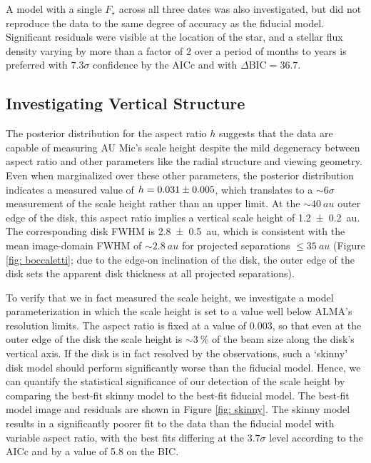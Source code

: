 \documentclass[modern]{aastex62}
\begin{document}
A model with a single $F_\star$ across all three dates was also investigated, but did not reproduce the data to the same degree of accuracy as the fiducial model.
Significant residuals were visible at the location of the star, and  a stellar flux density varying by more than a factor of 2 over a period of months to years is preferred with $7.3 \sigma$ confidence by the AICc and with $\Delta \text{BIC} = 36.7$.

\subsection{Investigating Vertical Structure}
\label{subsection: vertical analysis}

The posterior distribution for the aspect ratio $h$ suggests that the data are capable of measuring AU Mic's scale height despite the mild degeneracy between aspect ratio and other parameters like the radial structure and viewing geometry.  
Even when marginalized over these other parameters, the posterior distribution indicates a measured value of $h=\num{0.031 \pm 0.005}$, which translates to a $\sim 6 \sigma$ measurement of the scale height rather than an upper limit.
At the $\sim \SI{40}{au}$ outer edge of the disk, this aspect ratio implies a vertical scale height of \SI{1.2 \pm 0.2}{au}. 
The corresponding disk FWHM is \SI{2.8 \pm 0.5}{au}, which is consistent with the mean image-domain FWHM of $\sim \SI{2.8}{au}$ for projected separations $\leq \SI{35}{au}$ (Figure \ref{fig: boccaletti}; due to the edge-on inclination of the disk, the outer edge of the disk sets the apparent disk thickness at all projected separations).

To verify that we in fact measured the scale height, we investigate a model parameterization in which the scale height is set to a value well below ALMA's resolution limits.
The aspect ratio is fixed at a value of $0.003$, so that even at the outer edge of the disk the scale height is $\sim \SI{3}{\percent}$ of the beam size along the disk's vertical axis.
If the disk is in fact resolved by the observations, such a `skinny' disk model should perform significantly worse than the fiducial model.
Hence, we can quantify the statistical significance of our detection of the scale height by comparing the best-fit skinny model to the best-fit fiducial model.
The best-fit model image and residuals are shown in Figure \ref{fig: skinny}.
The skinny model results in a significantly poorer fit to the data than the fiducial model with variable aspect ratio, with the best fits differing at the $3.7 \sigma$ level according to the AICc and by a value of 5.8 on the BIC.
\end{document}
